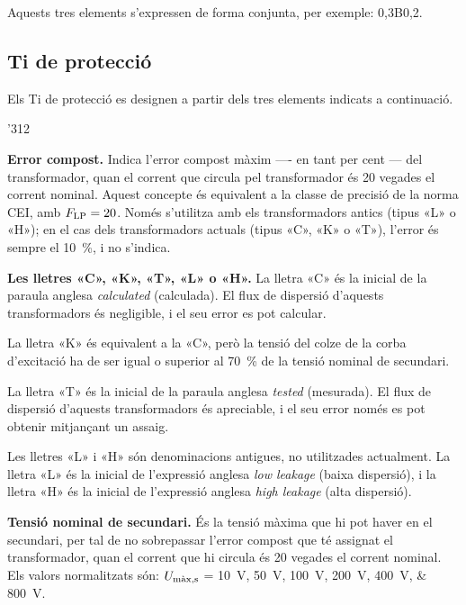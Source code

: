Aquests tres elements s'expressen de forma conjunta, per exemple:
0,3B0,2.

\subsection{Ti de protecció}\label{sec:Ti-prot-IEEE}

Els Ti de protecció es designen a
partir dels tres elements indicats a continuació.

\begin{dingautolist}{'312}
    \item \textbf{Error compost.} Indica l'error compost màxim ---- en tant per cent --- del
    transformador, quan el corrent que circula pel
    transformador és 20 vegades el corrent nominal. Aquest concepte
     és equivalent a la classe de precisió de la norma CEI,
     amb $F_\mathrm{LP}=20$. Només s'utilitza amb els transformadors antics (tipus «L» o «H»); en el cas dels transformadors actuals
     (tipus «C», «K» o «T»), l'error és sempre el \qty{10}{\percent}, i no s'indica.

    \item \textbf{Les lletres «C», «K», «T», «L» o «H».} La lletra «C» és la inicial de la
    paraula  anglesa \textit{calculated} (calculada). El flux de dispersió d'aquests transformadors és negligible, i el seu error es pot calcular.

    La lletra «K» és equivalent a la «C», però la tensió del colze de la corba d'excitació ha de ser igual o superior al \qty{70}{\percent}
    de la tensió nominal de secundari.

    La lletra «T» és la inicial de la   paraula  anglesa \textit{tested} (mesurada). El flux de dispersió d'aquests transformadors és apreciable, i el seu error només es pot obtenir mitjançant un assaig.

    Les lletres «L» i «H» són denominacions antigues,  no utilitzades actualment. La lletra «L» és la inicial de l'expressió anglesa \textit{low leakage} (baixa
    dispersió), i la lletra «H» és la inicial de l'expressió anglesa \textit{high leakage} (alta dispersió).  
 
    \item \textbf{Tensió nominal de secundari.} És la tensió màxima
    que hi pot haver en el secundari, per tal de no sobrepassar l'error compost que té
    assignat el transformador, quan el corrent que hi circula
     és 20 vegades el corrent nominal. Els valors
    normalitzats són: $U_\mathrm{m\grave{a}x,s}$ = \qtylist{10; 50; 100; 200; 400; 800}{V}.


\end{dingautolist}

